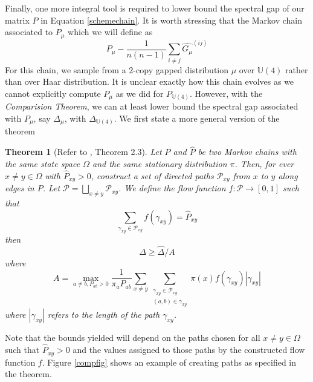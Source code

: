 \documentclass[12pt]{amsart}
\newtheorem{theorem}{Theorem}[section]
\theoremstyle{definition}
\theoremstyle{remark}
\numberwithin{equation}{section}
\theoremstyle{remark}
\begin{document}
Finally, one more integral tool is required to lower bound the spectral gap of our matrix $P$ in Equation \ref{schemechain}. It is worth stressing that the Markov chain associated to $P_{\mu}$ which we will define as
%
\begin{equation}
P_\mu - \frac{1}{n(n-1)}\sum_{i\neq j}\widehat{G_\mu}^{(ij)}
\end{equation}
For this chain, we sample from a $2$-copy gapped distribution $\mu $ over $\mathbb{U}(4)$ rather than over Haar distribution. It is unclear exactly how this chain evolves as we cannot explicitly compute $P_\mu$ as we did for $P_{\mathbb{U}(4)}$. However, with the \emph{Comparision Theorem}, we can at least lower bound the spectral gap associated with $P_\mu$, say $\Delta_\mu$, with $\Delta_{\mathbb{U}(4)}$. We first state a more general version of the theorem
%
\begin{theorem}[Refer to \cite{montenegro}, Theorem 2.3] \label{comptheorem}
  Let $P$ and $\widehat{P}$ be two Markov chains with the same state space $\Omega$ and the same stationary distribution $\pi$. Then, for ever $x \neq y \in \Omega$ with $\widehat{P}_{xy} > 0$, construct a set of directed paths $\mathcal{P}_{xy}$ from $x$ to $y$ along edges in $P$. Let $\mathcal{P} = \bigsqcup_{x\neq y} \mathcal{P}_{xy}$. We define the flow function $f: \mathcal{P} \rightarrow [0,1]$ such that
  \begin{equation}
    \sum_{\gamma_{xy} \in \mathcal{P}_{xy}} f(\gamma_{xy}) = \widehat{P}_{xy}
  \end{equation}
  then
  $$ \Delta \geq \widehat{\Delta}/A $$
  where
  $$ A = \max_{a \neq b, P_{ab} > 0}\frac{1}{\pi_aP_{ab}} \sum_{x \neq y}\sum_{
                          \substack {
                          \gamma_{xy} \in \mathcal{P}_{xy} \\
                          (a,b) \in \gamma_{xy}}}  \pi(x)f(\gamma_{xy})|\gamma_{xy}|$$
  where $|\gamma_{xy}|$ refers to the length of the path $\gamma_{xy}$.
\end{theorem}
\noindent Note that the bounds yielded will depend on the paths chosen for all $x \neq y \in \Omega$ such that $\widehat{P}_{xy} > 0$ and the values assigned to those paths by the constructed flow function $f$. Figure \ref{compfig} shows an example of creating paths as specified in the theorem.
%
\end{document}
